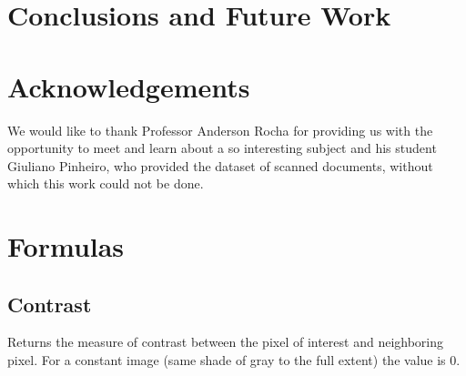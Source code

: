 \documentclass[10pt,twocolumn,letterpaper]{article}
\begin{document}
\section{Conclusions and Future Work}
\label{sec:conclusions}

\section{Acknowledgements}
\label{sec:acknownledgements}

We would like to thank Professor Anderson Rocha for providing us with the opportunity to meet and learn about a so interesting subject and his student Giuliano Pinheiro, who provided the dataset of scanned documents, without which this work could not be done.

{\small


}

\appendix
\label{app:Appendix A}

\section{Formulas}
\subsection{Contrast}

Returns the measure of contrast between the pixel of interest and neighboring pixel. For a constant image (same shade of gray to the full extent) the value is 0.
\end{document}
